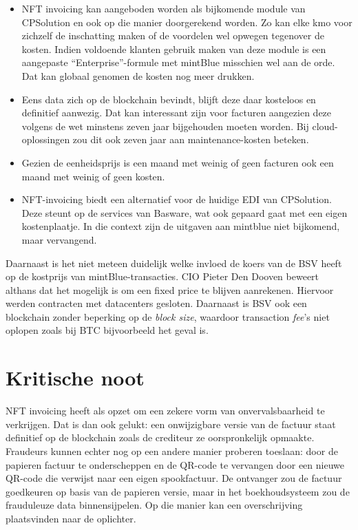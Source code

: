 \begin{itemize}
	\item NFT invoicing kan aangeboden worden als bijkomende module van CPSolution en ook op die manier doorgerekend worden. Zo kan elke kmo voor zichzelf de inschatting maken of de voordelen wel opwegen tegenover de kosten. Indien voldoende klanten gebruik maken van deze module is een aangepaste ``Enterprise''-formule met mintBlue misschien wel aan de orde. Dat kan globaal genomen de kosten nog meer drukken.
	\item Eens data zich op de blockchain bevindt, blijft deze daar kosteloos en definitief aanwezig. Dat kan interessant zijn voor facturen aangezien deze volgens de wet minstens zeven jaar bijgehouden moeten worden. Bij cloud-oplossingen zou dit ook zeven jaar aan maintenance-kosten beteken. 
	\item Gezien de eenheidsprijs is een maand met weinig of geen facturen ook een maand met weinig of geen kosten. 
	\item NFT-invoicing biedt een alternatief voor de huidige EDI van CPSolution. Deze steunt op de services van Basware, wat ook gepaard gaat met een eigen kostenplaatje. In die context zijn de uitgaven aan mintblue niet bijkomend, maar vervangend.
\end{itemize}

Daarnaast is het niet meteen duidelijk welke invloed de koers van de BSV heeft op de kostprijs van mintBlue-transacties. CIO Pieter Den Dooven beweert althans dat het mogelijk is om een fixed price te blijven aanrekenen. Hiervoor werden contracten met datacenters gesloten. Daarnaast is BSV ook een blockchain zonder beperking op de \textit{block size}, waardoor transaction \textit{fee}'s niet oplopen zoals bij BTC bijvoorbeeld het geval is\autocite{MNP2021}.

\newpage

\section{Kritische noot}
\label{sec:kritische-noot}

NFT invoicing heeft als opzet om een zekere vorm van onvervalsbaarheid te verkrijgen. Dat is dan ook gelukt: een onwijzigbare versie van de factuur staat definitief op de blockchain zoals de crediteur ze oorspronkelijk opmaakte. Fraudeurs kunnen echter nog op een andere manier proberen toeslaan: door de papieren factuur te onderscheppen en de QR-code te vervangen door een nieuwe QR-code die verwijst naar een eigen spookfactuur. De ontvanger zou de factuur goedkeuren op basis van de papieren versie, maar in het boekhoudsysteem zou de frauduleuze data binnensijpelen. Op die manier kan een overschrijving plaatsvinden naar de oplichter.

